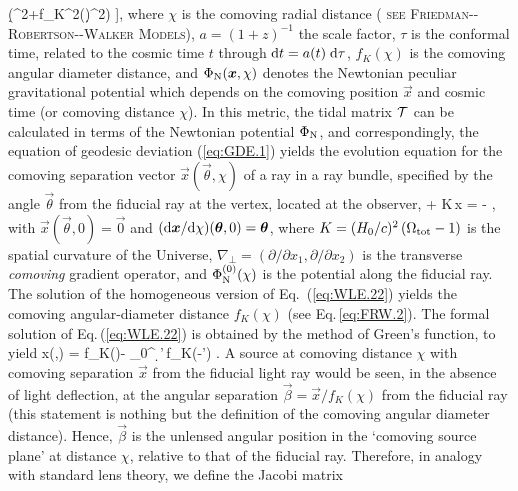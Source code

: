 {    \left(\d \chi^2+f_K^2(\chi)\d\omega^2\right)
  \right]\;,
\label{eq:WLE.21}
\ee
%
where $\chi$ is the comoving radial distance ({\scshape{\footnotesize
    see} \gls{Friedman--Robertson--Walker Models}}), $a=(1+z)^{-1}$ the
scale factor, 
$\tau$ is the conformal time, related to the cosmic
time $t$ through $\d t=a(t)\;\d \tau$, $f_K(\chi)$ is the comoving
angular diameter 
distance, and $\Phi_{\rm N}(\vec x,\chi)$
denotes the Newtonian peculiar gravitational potential which depends on the
comoving position $\vec x$ and cosmic time (or comoving distance $\chi$).
In this metric, the tidal matrix ${\cal T}$ can be calculated in terms of the
Newtonian potential $\Phi_{\rm N}$, and correspondingly,
the equation of geodesic deviation (\ref{eq:GDE.1})
yields the evolution equation for the comoving separation vector $\vec
x(\vec\theta,\chi)$ of a ray in a ray bundle, specified by the angle
$\vec\theta$ from the fiducial ray at the vertex, located at the 
observer, 
%
\be
{} +
K\,\vec x = -  \;,
\label{eq:WLE.22}
\ee
%
with $\vec x(\vec\theta,0)=\vec 0$ and $(\d\vec
x/\d\chi)(\vec\theta,0)=\vec\theta$,  
where $K=(H_0/c)^2\,(\Omega_{\rm tot}-1)$ is the spatial curvature of
the Universe, $\nabla_\perp=(\partial/\partial x_1,\partial/\partial
x_2)$ is the transverse {\it comoving} gradient operator, and
$\Phi^{(0)}_{\rm N}(\chi)$ is the potential along the fiducial ray.
The solution of the homogeneous version of Eq.\, (\ref{eq:WLE.22})
yields the comoving angular-diameter distance $f_K(\chi)$ (see
Eq.\,\ref{eq:FRW.2}). The
formal solution of Eq.\,(\ref{eq:WLE.22}) is obtained by the method of Green's
function, to yield
%
\be
  \vec x(\vec\theta,\chi) = f_K(\chi)\vec\theta - 
  \!\int_0^\chi\!\!\! \d \chi'\,f_K(\chi-\chi')\! 
   .
\label{eq:WLE.23}
\ee
%
A source at comoving distance $\chi$ with comoving separation $\vec x$
from the fiducial light ray would be seen, in the absence of light
deflection, at the angular separation $\vec \beta=\vec x/f_K(\chi)$
from the fiducial ray (this statement is nothing but the definition of
the comoving angular diameter distance).  Hence, $\vec\beta$ is the
unlensed angular position in the `comoving source plane' at distance
$\chi$, relative to that of the fiducial ray.  Therefore, in analogy with
standard lens theory, we define the Jacobi matrix}
